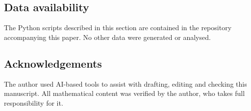 \documentclass[11pt]{amsart}
\numberwithin{equation}{section}
\begin{document}
\subsection*{Data availability}
The Python scripts described in this section are contained in the repository accompanying this paper. No other data were generated or analysed.

\subsection*{Acknowledgements}
The author used AI-based tools to assist with drafting, editing and checking this manuscript. All mathematical content was verified by the author, who takes full responsibility for it.



\end{document}

